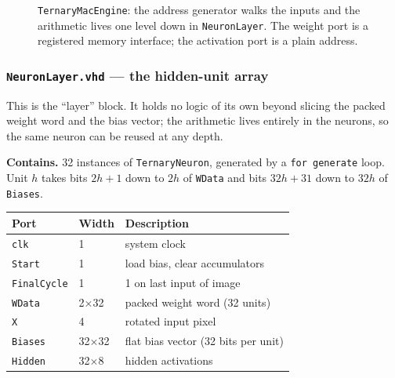 \documentclass[11pt,a4paper]{article}
\begin{document}
\begin{figure}[H]
\centering
{}
\caption{\texttt{TernaryMacEngine}: the address generator walks the inputs and
  the arithmetic lives one level down in \texttt{NeuronLayer}. The weight port
  is a registered memory interface; the activation port is a plain address.}
\label{fig:mac}
\end{figure}

\subsubsection{\texttt{NeuronLayer.vhd} --- the hidden-unit array}
\label{sub:neuronlayer}

This is the ``layer'' block. It holds no logic of its own beyond slicing the
packed weight word and the bias vector; the arithmetic lives entirely in the
neurons, so the same neuron can be reused at any depth.

\textbf{Contains.} 32 instances of \texttt{TernaryNeuron}, generated by a
\texttt{for~generate} loop. Unit $h$ takes bits $2h{+}1$ down to $2h$ of
\texttt{WData} and bits $32h{+}31$ down to $32h$ of \texttt{Biases}.

\begin{center}
\small
\begin{tabularx}{\linewidth}{@{}llL@{}}
\toprule
\textbf{Port} & \textbf{Width} & \textbf{Description} \\
\midrule
\texttt{clk}        & 1  & system clock \\
\texttt{Start}      & 1  & load bias, clear accumulators \\
\texttt{FinalCycle} & 1  & 1 on last input of image \\
\texttt{WData}      & 2$\times$32 & packed weight word (32 units) \\
\texttt{X}          & 4  & rotated input pixel \\
\texttt{Biases}     & 32$\times$32 & flat bias vector (32 bits per unit) \\
\texttt{Hidden}     & 32$\times$8 & hidden activations \\
\bottomrule
\end{tabularx}
\end{center}
\end{document}
